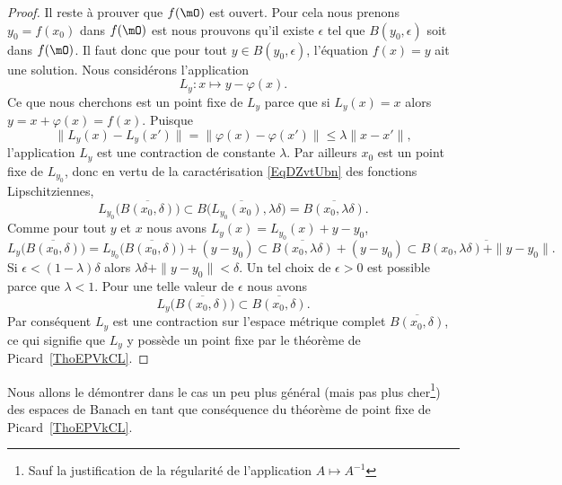 \begin{proof}
	Il reste à prouver que \( f(\mO)\) est ouvert. Pour cela nous prenons \( y_0=f(x_0)\) dans \( f(\mO)\) est nous prouvons qu'il existe \( \epsilon\) tel que \( B(y_0,\epsilon)\) soit dans \( f(\mO)\). Il faut donc que pour tout \( y\in B(y_0,\epsilon)\), l'équation \( f(x)=y\) ait une solution. Nous considérons l'application
	\begin{equation}
		L_y\colon x\mapsto y-\varphi(x).
	\end{equation}
	Ce que nous cherchons est un point fixe de \( L_y\) parce que si \( L_y(x)=x\) alors \( y=x+\varphi(x)=f(x)\). Puisque
	\begin{equation}
		\big\| L_y(x)-L_y(x') \big\|=\big\| \varphi(x)-\varphi(x') \big\|\leq\lambda\| x-x' \|,
	\end{equation}
	l'application \( L_y\) est une contraction de constante \( \lambda\). Par ailleurs \( x_0\) est un point fixe de \( L_{y_0}\), donc en vertu de la caractérisation \eqref{EqDZvtUbn} des fonctions Lipschitziennes,
	\begin{equation}
		L_{y_0}\big( \overline{ B(x_0,\delta) } \big)\subset \overline{ B\big( L_{y_0}(x_0),\lambda\delta \big) }=\overline{ B(x_0,\lambda\delta) }.
	\end{equation}
	Comme pour tout \( y\) et \( x\) nous avons \( L_y(x)=L_{y_0}(x)+y-y_0\),
	\begin{equation}
		L_y\big( \overline{ B(x_0,\delta) } \big)=L_{y_0}\big( \overline{ B(x_0,\delta) } \big)+(y-y_0)\subset \overline{ B(x_0,\lambda\delta) }+(y-y_0)\subset \overline{ B(x_0,\lambda\delta)+\| y-y_0 \| }.
	\end{equation}
	Si \( \epsilon<(1-\lambda)\delta\) alors \( \lambda\delta+\| y-y_0 \|<\delta\). Un tel choix de \( \epsilon>0\) est possible parce que \( \lambda<1\). Pour une telle valeur de \( \epsilon\) nous avons
	\begin{equation}
		L_y\big( \overline{ B(x_0,\delta) } \big)\subset \overline{ B(x_0,\delta) }.
	\end{equation}
	Par conséquent \( L_y\) est une contraction sur l'espace métrique complet \( \overline{ B(x_0,\delta) }\), ce qui signifie que \( L_y\) y possède un point fixe par le théorème de Picard~\ref{ThoEPVkCL}.
\end{proof}

Nous allons le démontrer dans le cas un peu plus général (mais pas plus cher\footnote{Sauf la justification de la régularité de l'application \( A\mapsto A^{-1}\)}) des espaces de Banach en tant que conséquence du théorème de point fixe de Picard~\ref{ThoEPVkCL}.


